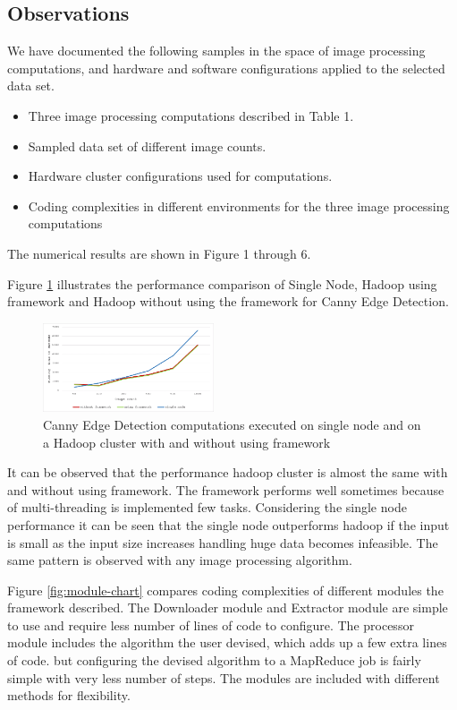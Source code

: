 \documentclass[conference]{IEEEtran}
\begin{document}
\subsection{Observations}   

We have documented the following samples in the space of image processing
computations, and hardware and software configurations applied to the selected
data set.
\begin{itemize}
	\item Three image processing computations described in Table 1.
	\item Sampled data set of different image counts.
	\item Hardware cluster configurations used for computations. 
	\item Coding complexities in different environments for the three image processing computations
\end{itemize}

The numerical results are shown in Figure 1 through 6.

Figure \ref{fig:perf-chart} illustrates the performance comparison of Single Node, Hadoop using framework and Hadoop without using the framework for Canny Edge Detection.

\begin{figure}[h]
	\centering
	\includegraphics[width=0.45\textwidth]{perf-graph}
	\caption{Canny Edge Detection computations executed on single node and on a Hadoop cluster with and without using framework}
	\label{fig:perf-chart}
\end{figure}
It can be observed that the performance hadoop cluster is almost the same with and without using framework. The framework performs well sometimes because of multi-threading is implemented few tasks. Considering the single node performance it can be seen that the single node outperforms hadoop if the input is small as the input size increases handling huge data becomes infeasible. The same pattern is observed with any image processing algorithm. 

Figure \ref{fig:module-chart} compares coding complexities of different modules the framework described. The Downloader module and Extractor module are simple to use and require less number of lines of code to configure. The processor module includes the algorithm the user devised, which adds up a few extra lines of code. but configuring the devised algorithm to a MapReduce job is fairly simple with very less number of steps. The modules are included with different methods for flexibility.  
\end{document}

